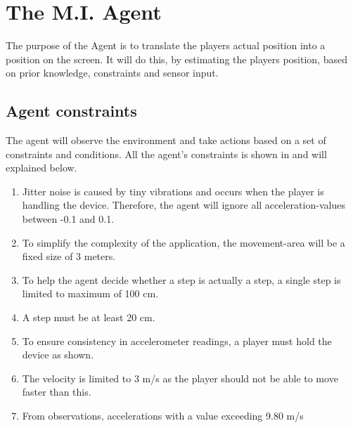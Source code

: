 \section{The M.I. Agent}\label{section:agent}
The purpose of the Agent is to translate the players actual position into a position on the screen.
It will do this, by estimating the players position, based on prior knowledge, constraints and sensor input.

\subsection{Agent constraints}
The agent will observe the environment and take actions based on a set of constraints and conditions.
All the agent's constraints is shown in  and will explained below.
\begin{enumerate}[label=(\alph*)]
\item Jitter noise is caused by tiny vibrations and occurs when the player is handling the device.
Therefore, the agent will ignore all acceleration-values between -0.1 and 0.1.
\item To simplify the complexity of the application, the movement-area will be a fixed size of 3 meters.
\item To help the agent decide whether a step is actually a step, a single step is limited to maximum of 100 cm.
\item A step must be at least 20 cm.
\item To ensure consistency in accelerometer readings, a player must hold the device as shown.
\item The velocity is limited to 3 m/s as the player should not be able to move faster than this.
\item %
From observations, accelerations with a value exceeding 9.80 m/s

\end{enumerate}





